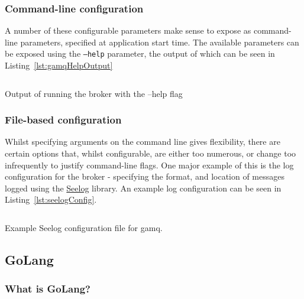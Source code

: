 \subsubsection{Command-line configuration}
\label{subs:Command-line configuration}

A number of these configurable parameters make sense to expose as command-line parameters, specified at application start time. The available parameters can be exposed using the \texttt{--help} parameter, the output of which can be seen in Listing~\ref{lst:gamqHelpOutput}

\begin{listing}[ht]
  \centering
  \inputminted{bash}{code/gamqHelpOutput}
  \caption{Output of running the broker with the --help flag}
  \label{lst:gamqHelpOutput}
\end{listing}

\subsubsection{File-based configuration}
\label{subs:File-based configuration}

Whilst specifying arguments on the command line gives flexibility, there are certain options that, whilst configurable, are either too numerous, or change too infrequently to justify command-line flags. One major example of this is the log configuration for the broker - specifying the format, and location of messages logged using the \href{https://github.com/cihub/seelog}{Seelog} library. An example log configuration can be seen in Listing~\ref{lst:seelogConfig}.

\begin{listing}[ht]
  \centering
  \inputminted{xml}{code/gamq/config/logconfig.xml}
  \caption{Example Seelog configuration file for gamq.}
  \label{lst:seelogConfig}
\end{listing}

\subsection{GoLang}
\label{sub:GoLang}


\subsubsection{What is GoLang?}
\label{subs:What is GoLang?}


